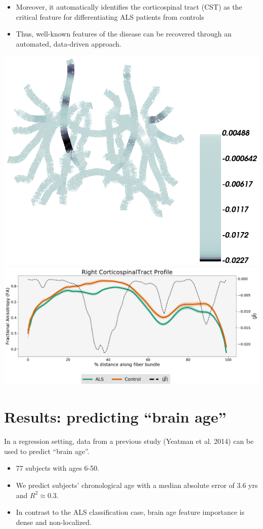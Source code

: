 \documentclass[a0, landscape]{a0poster}
\newenvironment{Figure}
  {\par\medskip\noindent\minipage{\linewidth}}
  {\endminipage\par\medskip}
\begin{document}
\begin{multicols}{3}
\begin{itemize}
\item Moreover, it automatically identifies the corticospinal tract (CST) as the critical feature for differentiating ALS patients from controls
\item Thus, well-known features of the disease can be recovered through an automated, data-driven approach.
\end{itemize}

\begin{Figure}
    \centering
    \includegraphics[width=0.30\linewidth, valign=m]{classification_beta_bone.png}
    \includegraphics[width=0.55\linewidth, valign=m]{classification_tract_profiles.pdf}
\end{Figure}

\vspace{-1.25em}
\section*{Results: predicting ``brain age''}

\noindent In a regression setting, data from a previous study (Yeatman et al. 2014) can be used to predict ``brain age''.
\begin{itemize}
    \item 77 subjects with ages 6-50.
    \item We predict subjects' chronological age with a median absolute error of 3.6 yrs and $R^2 \approx 0.3$.
    \item In contrast to the ALS classification case, brain age feature importance is dense and non-localized.
\end{itemize}


\end{multicols}
\end{document}

